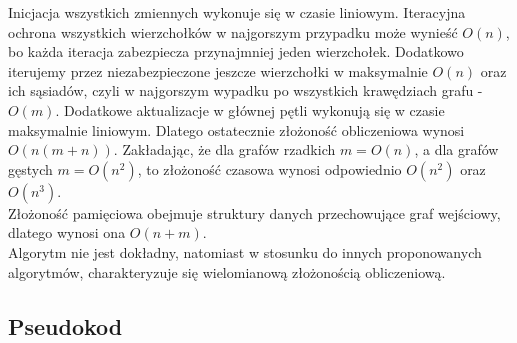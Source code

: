     Inicjacja wszystkich zmiennych wykonuje się w czasie liniowym. Iteracyjna ochrona wszystkich wierzchołków w najgorszym przypadku może wynieść $O(n)$, bo każda iteracja zabezpiecza przynajmniej jeden wierzchołek. Dodatkowo iterujemy przez niezabezpieczone jeszcze wierzchołki w maksymalnie $O(n)$ oraz ich sąsiadów, czyli w najgorszym wypadku po wszystkich krawędziach grafu - $O(m)$. Dodatkowe aktualizacje w głównej pętli wykonują się w czasie maksymalnie liniowym. Dlatego ostatecznie złożoność obliczeniowa wynosi $O(n(m+n))$. Zakładając, że dla grafów rzadkich $m=O(n)$, a dla grafów gęstych $m=O(n^2)$, to złożoność czasowa wynosi odpowiednio $O(n^2)$ oraz $O(n^3)$.\\
    Złożoność pamięciowa obejmuje struktury danych przechowujące graf wejściowy, dlatego wynosi ona $O(n+m)$.\\
    Algorytm nie jest dokładny, natomiast w stosunku do innych proponowanych algorytmów, charakteryzuje się wielomianową złożonością obliczeniową.
    
    \subsection{Pseudokod}

